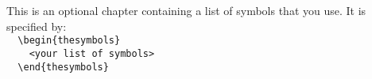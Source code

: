 \begin{thesymbols}
This is an optional chapter containing a list of symbols that
you use. It is specified by:\\[2ex]
\verb|  \begin{thesymbols}|\\
\verb|    <your list of symbols>|\\
\verb|  \end{thesymbols}|
\end{thesymbols}
